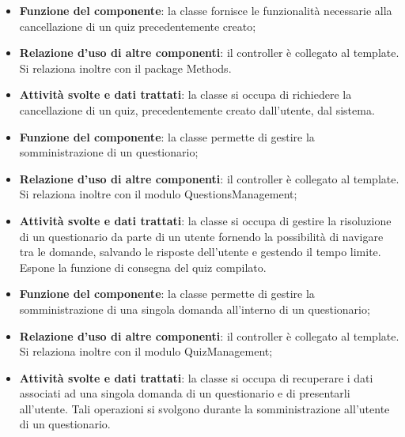 \begin{itemize}
	\item\textbf{Funzione del componente}: la classe fornisce le funzionalità necessarie alla cancellazione di un quiz precedentemente creato;
	\item\textbf{Relazione d'uso di altre componenti}: il controller è collegato al template. Si relaziona inoltre con il package Methods.
	\item\textbf{Attività svolte e dati trattati}:  la classe si occupa di richiedere la cancellazione di un quiz, precedentemente creato dall'utente, dal sistema.
\end{itemize}


\begin{itemize}
	\item\textbf{Funzione del componente}: la classe permette di gestire la somministrazione di un questionario;
	\item\textbf{Relazione d'uso di altre componenti}: il controller è collegato al template. Si relaziona inoltre con il modulo QuestionsManagement;
	\item\textbf{Attività svolte e dati trattati}: la classe si occupa di gestire la risoluzione di un questionario da parte di un utente fornendo la possibilità di navigare tra le domande, salvando le risposte dell'utente e gestendo il tempo limite. Espone la funzione di consegna del quiz compilato.
\end{itemize}


\begin{itemize}
	\item\textbf{Funzione del componente}: la classe permette di gestire la somministrazione di una singola domanda all'interno di un questionario;
	\item\textbf{Relazione d'uso di altre componenti}: il controller è collegato al template. Si relaziona inoltre con il modulo QuizManagement;
	\item\textbf{Attività svolte e dati trattati}: la classe si occupa di recuperare i dati associati ad una singola domanda di un questionario e di presentarli all'utente. Tali operazioni si svolgono durante la somministrazione all'utente di un questionario.
\end{itemize}


